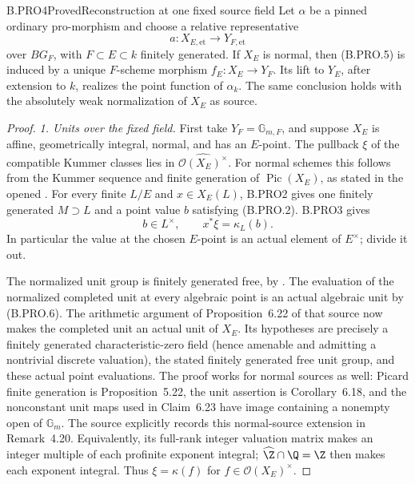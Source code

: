 \begin{claim}{B.PRO4}{Proved}{Reconstruction at one fixed source field}
Let \(\alpha\) be a pinned ordinary pro-morphism and choose a
relative representative
\[
                   a:X_{E,\mathrm{et}}\longrightarrow
                     Y_{F,\mathrm{et}}                 \tag{B.PRO.5}
\]
over \(BG_F\), with \(F\subset E\subset k\) finitely
generated. If \(X_E\) is normal, then (B.PRO.5) is induced by a
unique \(F\)-scheme morphism \(f_E:X_E\to Y_F\).
Its lift to \(Y_E\), after extension to \(k\), realizes the
point function of \(\alpha_k\). The same conclusion holds with
the absolutely weak normalization of \(X_E\) as source.
\end{claim}
\begin{proof}
\emph{1. Units over the fixed field.}
First take \(Y_F=\mathbb G_{m,F}\), and suppose \(X_E\) is
affine, geometrically integral, normal, and has an \(E\)-point.
The pullback \(\xi\) of the compatible Kummer classes lies in
\(\widehat{\mathcal O(X_E)^\times}\). For normal schemes this
follows from the Kummer sequence and finite generation of
\(\operatorname{Pic}(X_E)\), as stated in the opened
\citep[Proposition~5.22]{CarlsonHaineWolf2024}.
For every finite \(L/E\) and \(x\in X_E(L)\), B.PRO2 gives
one finitely generated \(M\supset L\) and a point value \(b\)
satisfying (B.PRO.2). B.PRO3 gives
\[
                         b\in L^\times,\qquad
                       x^*\xi=\kappa_L(b).              \tag{B.PRO.6}
\]
In particular the value at the chosen \(E\)-point is an actual
element of \(E^\times\); divide it out.

The normalized unit group is finitely generated free, by
\citep[Corollary~6.18]{CarlsonHaineWolf2024}. The evaluation of
the normalized completed unit at every algebraic point is an
actual algebraic unit by (B.PRO.6). The arithmetic argument of
Proposition~6.22 of that source now makes the completed unit
an actual unit of \(X_E\). Its hypotheses are precisely a
finitely generated characteristic-zero field (hence amenable
and admitting a nontrivial discrete valuation), the stated
finitely generated free unit group, and these actual point
evaluations. The proof works for normal sources as well:
Picard finite generation is Proposition~5.22, the unit assertion
is Corollary~6.18, and the nonconstant unit maps used in Claim~6.23
have image containing a nonempty open of \(\mathbb G_m\).
The source explicitly records this normal-source extension in
Remark~4.20. Equivalently, its full-rank integer valuation matrix
makes an integer multiple of each profinite exponent integral;
\(\widehat\Z\cap\Q=\Z\) then makes each exponent integral.
Thus \(\xi=\kappa(f)\) for \(f\in\mathcal O(X_E)^\times\).


\end{proof}
